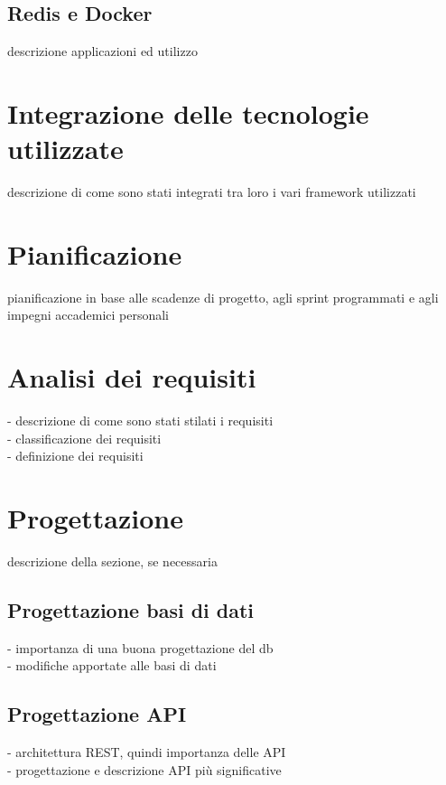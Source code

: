 \subsection{Redis e Docker}
descrizione applicazioni ed utilizzo

\section{Integrazione delle tecnologie utilizzate}
descrizione di come sono stati integrati tra loro i vari framework utilizzati

\section{Pianificazione}
pianificazione in base alle scadenze di progetto, agli sprint programmati e agli impegni accademici personali

\section{Analisi dei requisiti}
- descrizione di come sono stati stilati i requisiti\\
- classificazione dei requisiti\\
- definizione dei requisiti\\

\section{Progettazione}
descrizione della sezione, se necessaria
\subsection{Progettazione basi di dati}
- importanza di una buona progettazione del db\\
- modifiche apportate alle basi di dati\\

\subsection{Progettazione API}
- architettura REST, quindi importanza delle API\\
- progettazione e descrizione API più significative\\

